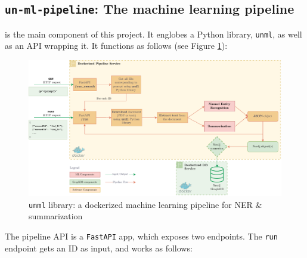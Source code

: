 
\subsection{\texttt{un-ml-pipeline}: The machine learning pipeline} \label{ssec:un-ml-pipeline-the-machine-learning-pipeline}

 is the main component of this project. It englobes a Python library, \texttt{unml}, as well as an API wrapping it. It functions as follows (see Figure \ref{fig:ml-pipeline}):



\begin{figure}[!htb]
    \centering

    \includegraphics[width=\linewidth]{res/ml-pipeline.pdf}
    \caption{\texttt{unml} library: a dockerized machine learning pipeline for NER \& summarization}

    \label{fig:ml-pipeline}
\end{figure}

The pipeline API is a \texttt{FastAPI} app, which exposes two endpoints. The \texttt{run} endpoint gets an ID as input, and works as follows:

